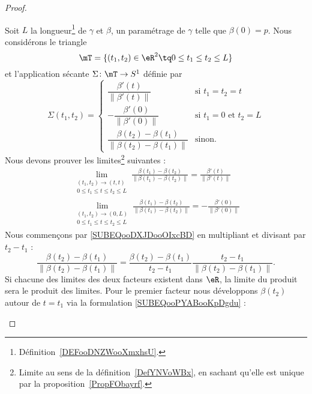 \begin{proof}
\begin{subproof}
		Soit \( L\) la longueur\footnote{Définition~\ref{DEFooDNZWooXmxhsU}.} de \( \gamma\) et \( \beta\), un paramétrage de \( \gamma\) telle que \( \beta(0)=p\). Nous considérons le triangle
		\begin{equation}
			\mT=\{ (t_1,t_2)\in \eR^2\tq 0\leq t_1\leq t_2\leq L \}
		\end{equation}
		et l'application sécante \( \Sigma\colon \mT\to S^1\) définie par
		\begin{equation}
			\Sigma(t_1,t_2)=\begin{cases}
				\dfrac{ \beta'(t) }{ \| \beta'(t) \| }                         & \text{si } t_1=t_2=t              \\
				-\dfrac{ \beta'(0) }{ \| \beta'(0) \| }                        & \text{si } t_1=0\text{ et } t_2=L \\
				\dfrac{ \beta(t_2)-\beta(t_1) }{ \| \beta(t_2)-\beta(t_1) \| } & \text{sinon}.
			\end{cases}
		\end{equation}
		Nous devons prouver les limites\footnote{Limite au sens de la définition~\ref{DefYNVoWBx}, en sachant qu'elle est unique par la proposition~\ref{PropFObayrf}.} suivantes :
		\begin{subequations}
			\begin{align}
				\lim_{\substack{(t_1,t_2)\to (t,t) \\0\leq t_1\leq t\leq t_2\leq L}}\frac{ \beta(t_1)-\beta(t_2) }{ \| \beta(t_1)-\beta(t_2) \| }=\frac{ \beta'(t) }{ \| \beta'(t) \| }      \label{SUBEQooDXJDooOIxcBD}  \\
				\lim_{\substack{(t_1,t_2)\to (0,L) \\0\leq t_1\leq t\leq t_2\leq L}}\frac{ \beta(t_1)-\beta(t_2) }{ \| \beta(t_1)-\beta(t_2) \| }=-\frac{ \beta'(0) }{ \| \beta'(0) \| }        \label{SUBEQooOXGSooXHEHHh}
			\end{align}
		\end{subequations}
		Nous commençons par \eqref{SUBEQooDXJDooOIxcBD} en multipliant et divisant par \( t_2-t_1\) :
		\begin{equation}
			\frac{ \beta(t_2)-\beta(t_1) }{ \|  \beta(t_2)-\beta(t_1)  \| }=\frac{  \beta(t_2)-\beta(t_1)  }{ t_2-t_1 }\frac{ t_2-t_1 }{ \|  \beta(t_2)-\beta(t_1)  \| }.
		\end{equation}
		Si chacune des limites des deux facteurs existent dans \( \eR\), la limite du produit sera le produit des limites. Pour le premier facteur nous développons \( \beta(t_2)\) autour de \( t=t_1\) via la formulation \eqref{SUBEQooPYABooKpDgdu} :

\end{subproof}
\end{proof}
